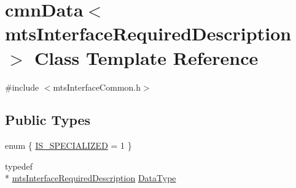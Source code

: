 \hypertarget{classcmn_data_3_01mts_interface_required_description_01_4}{\section{cmn\-Data$<$ mts\-Interface\-Required\-Description $>$ Class Template Reference}
\label{classcmn_data_3_01mts_interface_required_description_01_4}
}


{\ttfamily \#include $<$mts\-Interface\-Common.\-h$>$}

\subsection*{Public Types}
\begin{DoxyCompactItemize}
\item 
enum \{ \hyperlink{classcmn_data_3_01mts_interface_required_description_01_4_a0638ce17f4d83fcbdfbcd0e6dbfdda92a0e707344edbfbf19223d257659576c0e}{I\-S\-\_\-\-S\-P\-E\-C\-I\-A\-L\-I\-Z\-E\-D} = 1
 \}
\item 
typedef \\*
\hyperlink{classmts_interface_required_description}{mts\-Interface\-Required\-Description} \hyperlink{classcmn_data_3_01mts_interface_required_description_01_4_aa335fadfd965b6b92ab7fa93b18c547d}{Data\-Type}
\end{DoxyCompactItemize}
